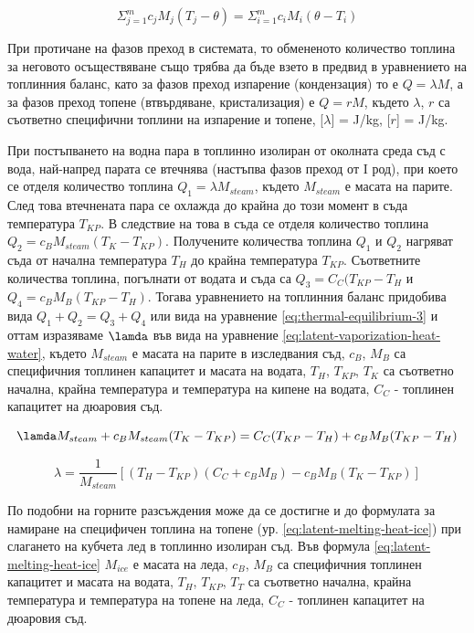\documentclass[12pt]{article}
\begin{document}
\begin{equation}\label{eq:thermal-equilibrium-2}
    \Sigma_{j=1}^mc_jM_j(T_j - \theta) = \Sigma_{i=1}^mc_iM_i(\theta - T_i)
\end{equation}

При протичане на фазов преход в системата, то обмененото количество топлина за неговото осъществяване също трябва да бъде взето в предвид в уравнението на топлинния баланс, като за фазов преход изпарение (кондензация) то е $Q = \lambda M$, а за фазов преход топене (втвърдяване, кристализация) е $Q = rM$, където $\lambda$, $r$ са съответно специфични топлини на изпарение и топене, [$\lambda$] = J/kg, [$r$] = J/kg.  

При постъпването на водна пара в топлинно изолиран от околната среда съд с вода, най-напред парата се втечнява (настъпва фазов преход от I род), при което се отделя количество топлина $Q_1 = \lambda M_{steam}$, където $M_{steam}$ е масата на парите. След това втечнената пара се охлажда до крайна до този момент в съда температура $T_{KP}$. В следствие на това в съда се отделя количество топлина $Q_2 = c_B M_{steam}(T_K - T_{KP})$. Получените количества топлина $Q_1$ и $Q_2$ нагряват съда от начална температура $T_H$ до крайна температура $T_{KP}$. Съответните количества топлина, погълнати от водата и съда са $Q_3 = C_C(T_{KP} - T_H$ и $Q_4 = c_BM_B(T_{KP} - T_H)$. Тогава уравнението на топлинния баланс придобива вида $Q_1 + Q_2 = Q_3 + Q_4$ или вида на уравнение \ref{eq:thermal-equilibrium-3} и оттам изразяваме $\lamda$ във вида на уравнение \ref{eq:latent-vaporization-heat-water}, където $M_{steam}$ е масата на парите в изследвания съд, $c_B$, $M_B$ са специфичния топлинен капацитет и масата на водата, $T_H$, $T_{KP}$, $T_K$ са съответно начална, крайна температура и температура на кипене на водата, $C_C$ - топлинен капацитет на дюаровия съд.

\begin{equation}\label{eq:thermal-equilibrium-3}
    \lamda M_{steam} + c_BM_{steam}(T_K - T_{KP}) = C_C(T_{KP} - T_H) + c_BM_B(T_{KP} - T_H)
\end{equation}

\begin{equation}\label{eq:latent-vaporization-heat-water}
    \lambda = \frac{1}{M_{steam}}
    \left[(T_H - T_{KP})(C_C + c_BM_B) - c_BM_B(T_{K} - T_{KP})\right]
\end{equation}


По подобни на горните разсъждения може да се достигне и до формулата за намиране на специфичен топлина на топене (ур. \ref{eq:latent-melting-heat-ice}) при слагането на кубчета лед в топлинно изолиран съд. Във формула \ref{eq:latent-melting-heat-ice} $M_{ice}$ е масата на леда, $c_B$, $M_B$ са специфичния топлинен капацитет и масата на водата, $T_H$, $T_{KP}$, $T_T$ са съответно начална, крайна температура и температура на топене на леда, $C_C$ - топлинен капацитет на дюаровия съд.  
\end{document}
